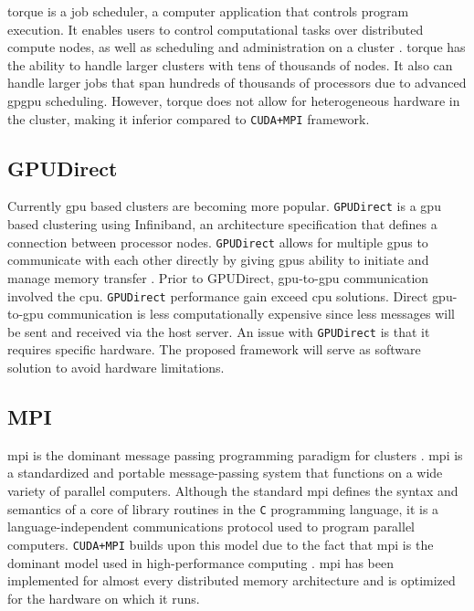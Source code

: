 \Gls{torque} is a job scheduler, a computer application that controls program
execution. It enables users to control computational tasks over distributed
compute nodes, as well as scheduling and administration on a cluster
\cite{website:TORQUE-Resource-Manager}. \Gls{torque} has the ability to handle
larger clusters with tens of thousands of nodes. It also can handle larger jobs
that span hundreds of thousands of processors due to advanced \gls{gpgpu}
scheduling.  However, \Gls{torque} does not allow for heterogeneous hardware in
the cluster, making it inferior compared to \texttt{CUDA+MPI} framework.

\subsection{GPUDirect}

Currently \gls{gpu} based clusters are becoming more popular.
\texttt{GPUDirect} is a \gls{gpu} based clustering using Infiniband, an
architecture specification that defines a connection between processor nodes.
\texttt{GPUDirect} allows for multiple \glspl{gpu} to communicate with each
other directly by giving \glspl{gpu} ability to initiate and manage memory
transfer \cite{website:YouTube}. Prior to GPUDirect, \gls{gpu}-to-\gls{gpu}
communication involved the \gls{cpu}. \texttt{GPUDirect} performance gain
exceed \gls{cpu} solutions. Direct \gls{gpu}-to-\gls{gpu} communication is less
computationally expensive since less messages will be sent and received via the
host server. An issue with \texttt{GPUDirect} is that it requires specific
hardware. The proposed framework will serve as software solution to avoid
hardware limitations.


\subsection{MPI}

\Gls{mpi} is the dominant message passing programming paradigm for clusters
\cite{website:Message-Passing-Interface-Forum}
\cite{website:Message-Passing-Interface}. \gls{mpi} is a standardized and
portable message-passing system that functions on a wide variety of parallel
computers. Although the standard \gls{mpi} defines the syntax and semantics of
a core of library routines in the \texttt{C} programming language, it is a
language-independent communications protocol used to program parallel
computers. \texttt{CUDA+MPI} builds upon this model due to the fact that
\gls{mpi} is the dominant model used in high-performance computing
\cite{sur2006high}. \Gls{mpi} has been implemented for almost every distributed
memory architecture and is optimized for the hardware on which it runs.

